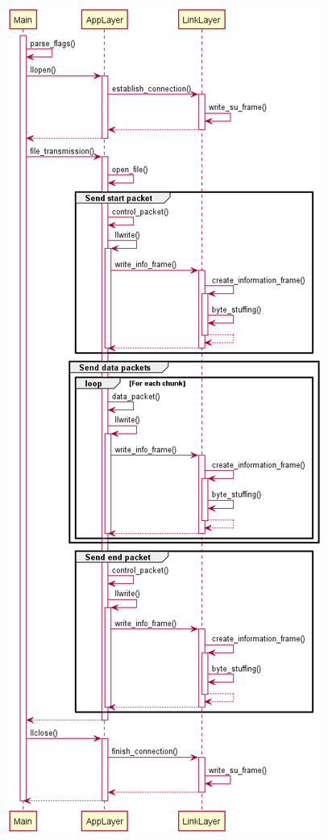 \documentclass[11pt]{report}
\begin{document}
\begin{center}
    \includegraphics[height=0.8\textheight]{images/Transmitter.png}
\end{center}
\end{document}
